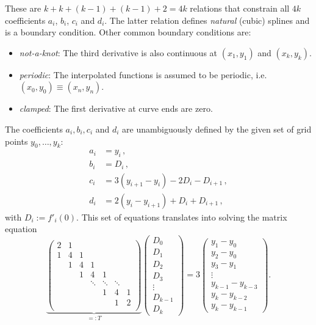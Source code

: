 These are $k + k + (k-1) + (k-1) + 2 = 4k$ relations that constrain all $4k$ coefficients $a_i$, $b_i$, $c_i$ and $d_i$.
The latter relation defines \textit{natural} (cubic) splines and is a boundary condition.
Other common boundary conditions are:
\begin{itemize}[itemsep=2pt,parsep=2pt]
    \item \textit{not-a-knot}: The third derivative is also continuous at $(x_1, y_1)$ and $(x_k, y_k)$.
    \item \textit{periodic}: The interpolated functions is assumed to be periodic, i.e. $(x_0, y_0) \equiv (x_n, y_n)$.
    \item \textit{clamped}: The first derivative at curve ends are zero.
\end{itemize}
The coefficients $a_i, b_i, c_i$ and $d_i$ are unambiguously defined by the given set of grid points $y_0,\ldots,y_k$:
\begin{align*}
    a_i &= y_i \,, \\
    b_i &= D_i \,, \\
    c_i &= 3(y_{i+1} - y_{i}) - 2D_i - D_{i+1} \,, \\
    d_i &= 2(y_i - y_{i+1}) + D_i + D_{i+1} \,,
\end{align*}
with $D_i := f'_i(0)$.
This set of equations translates into solving the matrix equation
\begin{equation*}
    \underbrace{\begin{pmatrix}
        2 & 1 \\
        1 & 4 & 1 \\
        & 1 & 4 & 1 \\
        & & 1 & 4 & 1 \\
        & & & \ddots & \ddots & \ddots \\
        & & & & 1 & 4 & 1 \\
        & & & & & 1 & 2 \\
    \end{pmatrix}}_{=: T}
    \begin{pmatrix}
        D_0 \\ D_1 \\ D_2 \\ D_3 \\ \vdots \\ D_{k-1} \\ D_k
    \end{pmatrix} = 3
    \begin{pmatrix}
        y_1 - y_0 \\
        y_2 - y_0 \\
        y_3 - y_1 \\
        \vdots \\
        y_{k-1} - y_{k-3} \\
        y_k - y_{k-2} \\
        y_k - y_{k-1}
    \end{pmatrix}.
\end{equation*}
